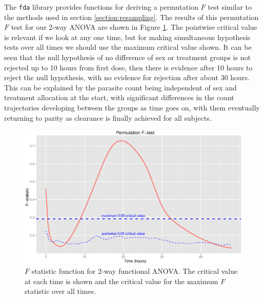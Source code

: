 The \texttt{fda} library provides functions for deriving a permutation $F$ test similar to the methods used in section \ref{section:resampling}. The results of this permutation $F$ test for our 2-way ANOVA are shown in Figure \ref{fdapermF}. The pointwise critical value is relevant if we look at any one time, but for making simultaneous hypothesis tests over all times we should use the maximum critical value shown. It can be seen that the null hypothesis of no difference of sex or treatment groups is not rejected up to 10 hours from first dose, then there is evidence after 10 hours to reject the null hypothesis, with no evidence for rejection after about 30 hours. This can be explained by the parasite count being independent of sex and treatment allocation at the start, with significant differences in the count trajectories developing between the groups as time goes on, with them eventually returning to parity as clearance is finally achieved for all subjects.
\begin{figure}[p]
\includegraphics[width=150mm]{fdapermF.eps} 
\caption{$F$ statistic function for 2-way functional ANOVA. The critical value at each time is shown and the critical value for the maximum $F$ statistic over all times.}
\label{fdapermF}
\end{figure}

